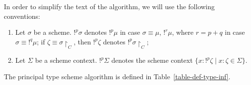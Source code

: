 In order to simplify the text of the algorithm, we will use the following conventions:
\begin{enumerate}[$\bullet$]
\item Let $\sigma $ be a scheme. $!^{p}\sigma $ denotes $!^{p}\mu$ in case $\sigma \equiv \mu$,
$!^{r}\mu$, where $r=p+q$ in case $\sigma \equiv !^{q}\mu$; if $\zeta \equiv \sigma \restriction_{C}$, then
$!^{p}\zeta $ denotes $!^{p}\sigma \restriction_{C}$;
\item Let $\Sigma $ be a scheme context. $!^{p}\Sigma$ denotes the scheme context 
$\{x:!^{p}\zeta \mid x:\zeta \in \Sigma \}. $
\end{enumerate}

The principal type scheme algorithm is defined in
Table~\ref{table-def-type-inf}.

\begin{table*}
\begin{center}
\end{center}
\end{table*}
